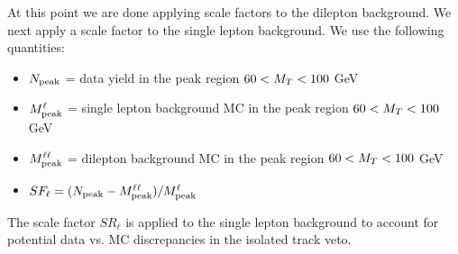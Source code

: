 At this point we are done applying scale factors to the dilepton background. We next apply a scale factor to the single lepton
background. We use the following quantities:

\begin{itemize}
\item $N_{\rm{peak}}$ =  data yield in the peak region $60<M_T<100$ GeV
\item $M^{\ell}_{\rm{peak}}$ =  single lepton background MC in the peak region $60<M_T<100$ GeV
\item $M^{\ell\ell}_{\rm{peak}}$ =  dilepton background MC in the peak region $60<M_T<100$ GeV
\item $SF_{\ell} = (N_{\rm{peak}} - M^{\ell\ell}_{\rm{peak}} )/ M^{\ell}_{\rm{peak}}$
\end{itemize}

The scale factor $SR_{\ell}$ is applied to the single lepton background to account for potential data vs. MC discrepancies 
in the isolated track veto.


